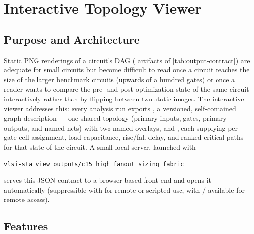 \chapter{Interactive Topology Viewer}
\label{ch:viewer}

\section{Purpose and Architecture}
\label{sec:viewer-purpose}

Static PNG renderings of a circuit's DAG ( artifacts of
\cref{tab:output-contract}) are adequate for small circuits but become
difficult to read once a circuit reaches the size of the larger benchmark
circuits (upwards of a hundred gates) or once a reader wants to compare the
pre- and post-optimization state of the same circuit interactively rather
than by flipping between two static images. The interactive viewer
addresses this: every analysis run exports , a
versioned, self-contained graph description --- one shared topology
(primary inputs, gates, primary outputs, and named nets) with two named
overlays,  and , each supplying
per-gate cell assignment, load capacitance, rise/fall delay, and ranked
critical paths for that state of the circuit. A small local server,
launched with

\begin{lstlisting}[language=bash, style=pythonstyle, numbers=none]
vlsi-sta view outputs/c15_high_fanout_sizing_fabric
\end{lstlisting}

serves this JSON contract to a browser-based front end and opens it
automatically (suppressible with  for remote or scripted
use, with / available for remote access).

\section{Features}
\label{sec:viewer-features}

